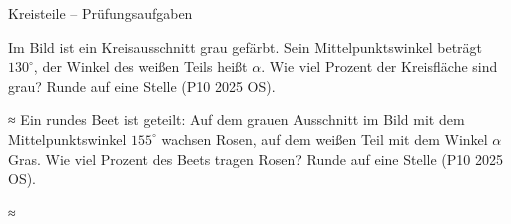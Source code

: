 \setcounter{aufgabe}{6}

\begin{aufgabe}{Kreisteile – Prüfungsaufgaben}
\begin{teile}
\teil Im Bild ist ein Kreisausschnitt grau gefärbt. Sein Mittelpunktswinkel beträgt $130^\circ$, der Winkel des weißen Teils heißt $\alpha$. Wie viel Prozent der Kreisfläche sind grau? Runde auf eine Stelle \hfill (P10 2025 OS).

≈ \leerfeld[\%]
\teil Ein rundes Beet ist geteilt: Auf dem grauen Ausschnitt im Bild mit dem Mittelpunktswinkel $155^\circ$ wachsen Rosen, auf dem weißen Teil mit dem Winkel $\alpha$ Gras. Wie viel Prozent des Beets tragen Rosen? Runde auf eine Stelle \hfill (P10 2025 OS).

≈ \leerfeld[\%]
\end{teile}
\end{aufgabe}
